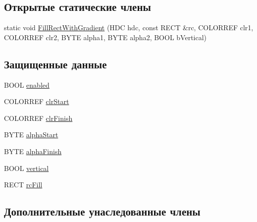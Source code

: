 \subsection*{Открытые статические члены}
\begin{DoxyCompactItemize}
\item 
static void \hyperlink{class_back_ground_a3561380bde27c92d3f8457dcc3c7e91d}{Fill\-Rect\-With\-Gradient} (H\-D\-C hdc, const R\-E\-C\-T \&rc, C\-O\-L\-O\-R\-R\-E\-F clr1, C\-O\-L\-O\-R\-R\-E\-F clr2, B\-Y\-T\-E alpha1, B\-Y\-T\-E alpha2, B\-O\-O\-L b\-Vertical)
\end{DoxyCompactItemize}
\subsection*{Защищенные данные}
\begin{DoxyCompactItemize}
\item 
B\-O\-O\-L \hyperlink{class_back_ground_a7f8e544399813801ce7dc06509a4c062}{enabled}
\item 
C\-O\-L\-O\-R\-R\-E\-F \hyperlink{class_back_ground_ace5c696580cb70d04c43326e313d5086}{clr\-Start}
\item 
C\-O\-L\-O\-R\-R\-E\-F \hyperlink{class_back_ground_a76b44a73628e8503a1e56bc5253a5b1a}{clr\-Finish}
\item 
B\-Y\-T\-E \hyperlink{class_back_ground_ad3d27841bc53e26e464ed774aeaaad8d}{alpha\-Start}
\item 
B\-Y\-T\-E \hyperlink{class_back_ground_ae275790b73848c8919b63541ae948b0e}{alpha\-Finish}
\item 
B\-O\-O\-L \hyperlink{class_back_ground_a60e91e14cfea358477466c03bc918514}{vertical}
\item 
R\-E\-C\-T \hyperlink{class_back_ground_ab617902b70204abeba1512a5a85c3114}{rc\-Fill}
\end{DoxyCompactItemize}
\subsection*{Дополнительные унаследованные члены}


